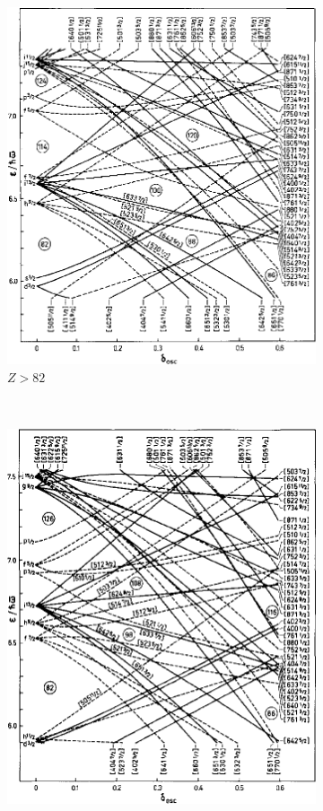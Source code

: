 \documentclass[10pt,a4paper, twoside, openright]{report}
\begin{document}
\begin{figure}
\begin{subfigure}[b]{0.45\textwidth}
    \includegraphics[width=\textwidth]{./figures/Nilsson/proton_deformed82.png}
    \caption{$Z>82$}
\end{subfigure}
\\
\begin{subfigure}[b]{0.48\textwidth}
    \includegraphics[width=\textwidth]{./figures/Nilsson/neutron_deformed82.png}

\end{subfigure}
\end{figure}
\end{document}
